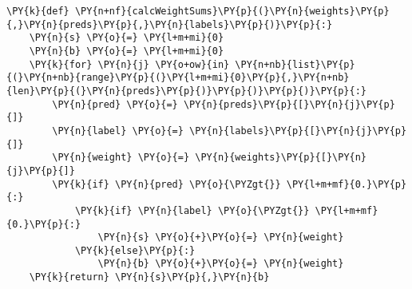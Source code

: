 {\par%
\vspace{-1\baselineskip}%
}%
\begin{notebookcell}[]%
\begin{addmargin}[\cellleftmargin]{0em}%
{\smaller%
\par%
%
\vspace{-1\smallerfontscale}%
\begin{Verbatim}[commandchars=\\\{\}]
\PY{k}{def} \PY{n+nf}{calcWeightSums}\PY{p}{(}\PY{n}{weights}\PY{p}{,}\PY{n}{preds}\PY{p}{,}\PY{n}{labels}\PY{p}{)}\PY{p}{:}
    \PY{n}{s} \PY{o}{=} \PY{l+m+mi}{0}
    \PY{n}{b} \PY{o}{=} \PY{l+m+mi}{0}
    \PY{k}{for} \PY{n}{j} \PY{o+ow}{in} \PY{n+nb}{list}\PY{p}{(}\PY{n+nb}{range}\PY{p}{(}\PY{l+m+mi}{0}\PY{p}{,}\PY{n+nb}{len}\PY{p}{(}\PY{n}{preds}\PY{p}{)}\PY{p}{)}\PY{p}{)}\PY{p}{:}
        \PY{n}{pred} \PY{o}{=} \PY{n}{preds}\PY{p}{[}\PY{n}{j}\PY{p}{]}
        \PY{n}{label} \PY{o}{=} \PY{n}{labels}\PY{p}{[}\PY{n}{j}\PY{p}{]}
        \PY{n}{weight} \PY{o}{=} \PY{n}{weights}\PY{p}{[}\PY{n}{j}\PY{p}{]}
        \PY{k}{if} \PY{n}{pred} \PY{o}{\PYZgt{}} \PY{l+m+mf}{0.}\PY{p}{:}
            \PY{k}{if} \PY{n}{label} \PY{o}{\PYZgt{}} \PY{l+m+mf}{0.}\PY{p}{:}
                \PY{n}{s} \PY{o}{+}\PY{o}{=} \PY{n}{weight}
            \PY{k}{else}\PY{p}{:}
                \PY{n}{b} \PY{o}{+}\PY{o}{=} \PY{n}{weight}
    \PY{k}{return} \PY{n}{s}\PY{p}{,}\PY{n}{b}
\end{Verbatim}
%
\par%
\vspace{-1\smallerfontscale}}%
\end{addmargin}
\end{notebookcell}



